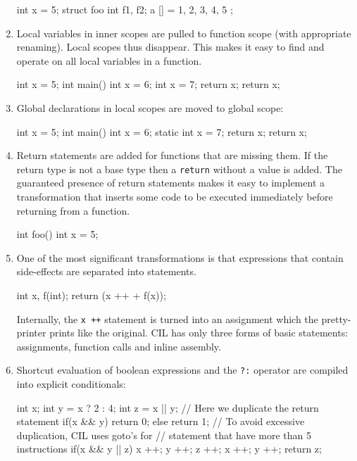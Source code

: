 \documentclass{article}
\def\t#1{{\tt #1}}
\begin{document}
\begin{enumerate}
\begin{cilcode}[local]
  int x = 5; 
  struct foo { int f1, f2; } a [] = {1, 2, 3, 4, 5 };
\end{cilcode}

\item Local variables in inner scopes are pulled to function scope (with
appropriate renaming). Local scopes thus disappear. This makes it easy to find
and operate on all local variables in a function.

\begin{cilcode}[global]
  int x = 5; 
  int main() {
    int x = 6;
    { 
      int x = 7;
      return x;
    }
    return x;
  } 
\end{cilcode}

\item Global declarations in local scopes are moved to global scope:
\begin{cilcode}[global]
  int x = 5; 
  int main() {
    int x = 6;
    { 
      static int x = 7;
      return x;
    }
    return x;
  } 
\end{cilcode}

\item Return statements are added for functions that are missing them. If the
return type is not a base type then a \t{return} without a value is added.
The guaranteed presence of return statements makes it easy to implement a
transformation that inserts some code to be executed immediately before
returning from a function.
\begin{cilcode}[global]
  int foo() {
    int x = 5;
  } 
\end{cilcode}

\item One of the most significant transformations is that expressions that
contain side-effects are separated into statements. 

\begin{cilcode}[local]
   int x, f(int);
   return (x ++ + f(x));
\end{cilcode}

 Internally, the \t{x ++} statement is turned into an assignment which the
pretty-printer prints like the original. CIL has only three forms of basic
statements: assignments, function calls and inline assembly.

\item Shortcut evaluation of boolean expressions and the \t{?:} operator are
compiled into explicit conditionals:
\begin{cilcode}[local]
  int x;
  int y = x ? 2 : 4;
  int z = x || y;
  // Here we duplicate the return statement
  if(x && y) { return 0; } else { return 1; }
  // To avoid excessive duplication, CIL uses goto's for 
  // statement that have more than 5 instructions
  if(x && y || z) { x ++; y ++; z ++; x ++; y ++; return z; }
\end{cilcode}


\end{enumerate}
\end{document}
